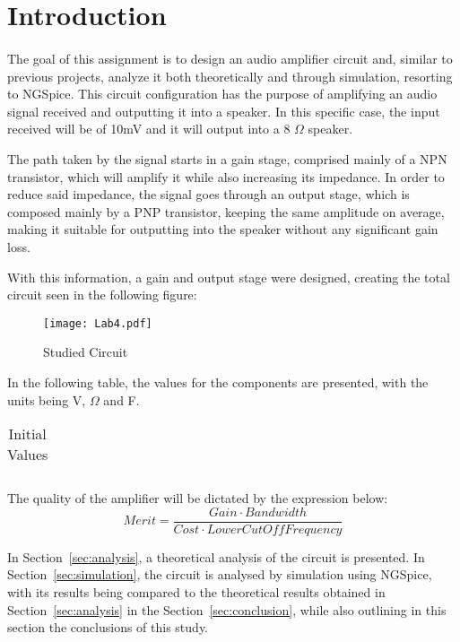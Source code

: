 \section{Introduction}
\label{sec:introduction}
\paragraph{}
\par The goal of this assignment is to design an audio amplifier circuit and, similar to previous projects, analyze it both theoretically and through simulation, resorting to NGSpice. This circuit configuration has the purpose of amplifying an audio signal received and outputting it into a speaker. In this specific case, the input received will be of 10mV and it will output into a 8 $\Omega$ speaker.
\par The path taken by the signal starts in a gain stage, comprised mainly of a NPN transistor, which will amplify it while also increasing its impedance. In order to reduce said impedance, the signal goes through an output stage, which is composed mainly by a PNP transistor, keeping the same amplitude on average, making it suitable for outputting into the speaker without any significant gain loss.
\par With this information, a gain and output stage were designed, creating the total circuit seen in the following figure:
\begin{figure}[H]
    \texttt{[image: Lab4.pdf]}
    \centering
    \caption{Studied Circuit}
    \label{circuit}
\end{figure}
\par In the following table, the values for the components are presented, with the units being V, $\Omega$ and F.

\begin{table}[H]
    \centering
    \begin{tabular}{|c|c|}
    \hline
        
    \end{tabular}
    \caption{Initial Values}
    \label{table4a}
\end{table}

\par The quality of the amplifier will be dictated by the expression below:
\[Merit=\frac{Gain \cdot Bandwidth}{Cost \cdot LowerCutOffFrequency}\]


In Section~\ref{sec:analysis}, a theoretical analysis of the circuit is
presented. In Section~\ref{sec:simulation}, the circuit is analysed by
simulation using NGSpice, with its results being compared to the theoretical results obtained in
Section~\ref{sec:analysis} in the Section~\ref{sec:conclusion}, while also outlining in this section the conclusions of this study.	
